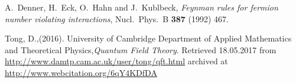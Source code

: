 \begin{thebibliography}{56}
A.~Denner, H.~Eck, O.~Hahn and J.~Kublbeck,
\textit{Feynman rules for fermion number violating interactions},
Nucl.\ Phys.\ B {\textbf{387}} (1992) 467.

Tong, D.,(2016). University of Cambridge Department of Applied Mathematics and Theoretical Physics,\textit{Quantum Field Theory}.  Retrieved
18.05.2017 from \href{http://www.damtp.cam.ac.uk/user/tong/qft.html}{http://www.damtp.cam.ac.uk/user/tong/qft.html} archived at
\href{http://www.webcitation.org/6qY4KDfDA}{http://www.webcitation.org/6qY4KDfDA}
\end{thebibliography}
